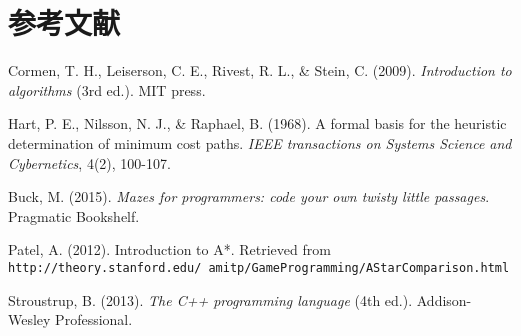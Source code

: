 \documentclass[UTF8]{ctexart}
\begin{document}
\section{参考文献}

\begin{thebibliography}{9}
Cormen, T. H., Leiserson, C. E., Rivest, R. L., \& Stein, C. (2009). 
\textit{Introduction to algorithms} (3rd ed.). MIT press.

Hart, P. E., Nilsson, N. J., \& Raphael, B. (1968). 
A formal basis for the heuristic determination of minimum cost paths. 
\textit{IEEE transactions on Systems Science and Cybernetics}, 4(2), 100-107.

Buck, M. (2015). 
\textit{Mazes for programmers: code your own twisty little passages}. 
Pragmatic Bookshelf.

Patel, A. (2012). 
Introduction to A*. Retrieved from 
\texttt{http://theory.stanford.edu/~amitp/GameProgramming/AStarComparison.html}

Stroustrup, B. (2013). 
\textit{The C++ programming language} (4th ed.). 
Addison-Wesley Professional.
\end{thebibliography}
\end{document}
